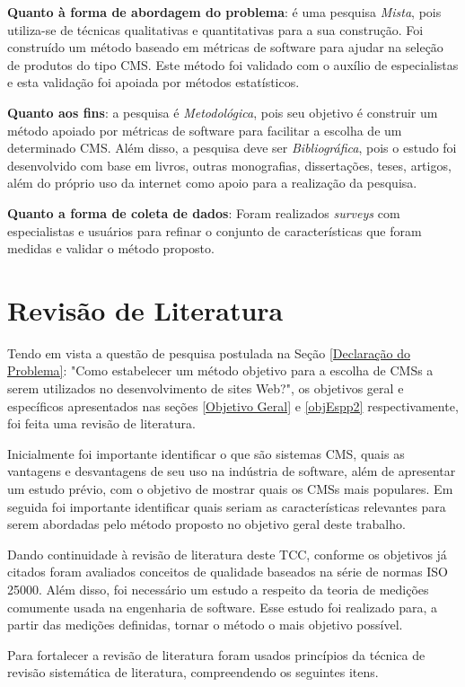 \textbf{Quanto à forma de abordagem do problema}: é uma pesquisa \textit{Mista}, pois utiliza-se de técnicas qualitativas e quantitativas para a sua construção. Foi construído um método baseado em métricas de software para ajudar na seleção de produtos do tipo CMS. Este método foi validado com o auxílio de especialistas e esta validação foi apoiada por métodos estatísticos. 
 

\textbf{Quanto aos fins}: a pesquisa é \textit{Metodológica}, pois seu objetivo é construir um método apoiado por métricas de software para facilitar a escolha de um determinado CMS. Além disso, a pesquisa deve ser \textit{Bibliográfica}, pois o estudo foi desenvolvido com base em livros, outras monografias, dissertações, teses, artigos, além do próprio uso da internet como apoio para a realização da pesquisa.

\textbf{Quanto a forma de coleta de dados}: Foram realizados \textit{surveys} com especialistas e usuários para refinar o conjunto de características que foram medidas e validar o método proposto.

\section{Revisão de Literatura}

Tendo em vista a questão de pesquisa postulada na Seção \ref{Declaração do Problema}: "Como estabelecer um método objetivo para a escolha de CMSs a serem utilizados no desenvolvimento de sites Web?", os objetivos geral e específicos apresentados nas seções \ref{Objetivo Geral} e \ref{objEspp2} respectivamente, foi feita uma revisão de literatura.

Inicialmente foi importante identificar o que são sistemas CMS, quais as vantagens e desvantagens de seu uso na indústria de software, além de apresentar um estudo prévio, com o objetivo de mostrar quais os CMSs mais populares. Em seguida foi importante identificar quais seriam as características relevantes para serem abordadas pelo método proposto no objetivo geral deste trabalho.

 Dando continuidade à revisão de literatura deste TCC, conforme os objetivos já citados foram avaliados conceitos de qualidade baseados na série de normas ISO 25000. Além disso, foi necessário  um estudo a respeito da teoria de medições comumente usada na engenharia de software. Esse estudo foi realizado para, a partir das medições definidas, tornar o método o mais objetivo possível.  
 
 Para fortalecer a revisão de literatura foram usados princípios da técnica de revisão sistemática de literatura, compreendendo os seguintes itens.
 
